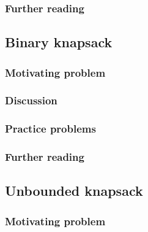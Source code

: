 \subsubsection*{Further reading}

\subsection{Binary knapsack}

\subsubsection*{Motivating problem}







\subsubsection*{Discussion}

\subsubsection*{Practice problems}

\subsubsection*{Further reading}

\subsection{Unbounded knapsack}

\subsubsection*{Motivating problem}






